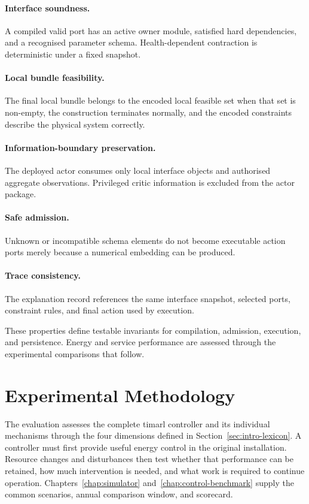 \paragraph{Interface soundness.}
A compiled valid port has an active owner module, satisfied hard dependencies, and a recognised parameter schema. Health-dependent contraction is deterministic under a fixed snapshot.

\paragraph{Local bundle feasibility.}
The final local bundle belongs to the encoded local feasible set when that set is non-empty, the construction terminates normally, and the encoded constraints describe the physical system correctly.

\paragraph{Information-boundary preservation.}
The deployed actor consumes only local interface objects and authorised aggregate observations. Privileged critic information is excluded from the actor package.

\paragraph{Safe admission.}
Unknown or incompatible schema elements do not become executable action ports merely because a numerical embedding can be produced.

\paragraph{Trace consistency.}
The explanation record references the same interface snapshot, selected ports, constraint rules, and final action used by execution.

These properties define testable invariants for compilation, admission, execution, and persistence. Energy and service performance are assessed through the experimental comparisons that follow.

\section{Experimental Methodology}
\label{sec:timarl-methodology}

The evaluation assesses the complete \gls{timarl} controller and its individual mechanisms through the four dimensions defined in Section~\ref{sec:intro-lexicon}. A controller must first provide useful energy control in the original installation. Resource changes and disturbances then test whether that performance can be retained, how much intervention is needed, and what work is required to continue operation. Chapters~\ref{chap:simulator} and~\ref{chap:control-benchmark} supply the common scenarios, annual comparison window, and scorecard.


